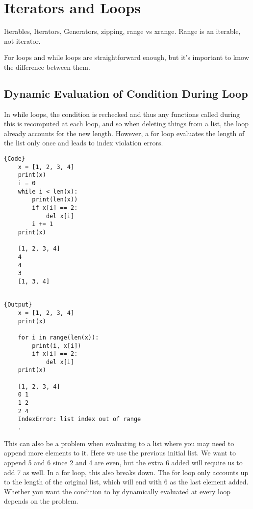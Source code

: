 \section{Iterators and Loops}

  Iterables, Iterators, Generators, zipping, range vs xrange. Range is an iterable, not iterator. 

  For loops and while loops are straightforward enough, but it's important to know the difference between them. 

\subsection{Dynamic Evaluation of Condition During Loop}

  In while loops, the condition is rechecked and thus any functions called during this is recomputed at each loop, and so when deleting things from a list, the loop already accounts for the new length. However, a for loop evaluates the length of the list only once and leads to index violation errors.  

  \noindent\begin{minipage}{.5\textwidth}
  \begin{lstlisting}[]{Code}
    x = [1, 2, 3, 4]
    print(x)
    i = 0
    while i < len(x): 
        print(len(x))
        if x[i] == 2: 
            del x[i]
        i += 1
    print(x)

    [1, 2, 3, 4]
    4
    4
    3
    [1, 3, 4]
    
  \end{lstlisting}
  \end{minipage}
  \hfill
  \begin{minipage}{.49\textwidth}
  \begin{lstlisting}[]{Output}
    x = [1, 2, 3, 4]
    print(x) 

    for i in range(len(x)):
        print(i, x[i])
        if x[i] == 2: 
            del x[i]
    print(x)

    [1, 2, 3, 4]
    0 1
    1 2
    2 4
    IndexError: list index out of range
    .
  \end{lstlisting}
  \end{minipage}

  This can also be a problem when evaluating to a list where you may need to append more elements to it. Here we use the previous initial list. We want to append 5 and 6 since 2 and 4 are even, but the extra 6 added will require us to add 7 as well.   In a for loop, this also breaks down. The for loop only accounts up to the length of the original list, which will end with 6 as the last element added. Whether you want the condition to by dynamically evaluated at every loop depends on the problem. 

